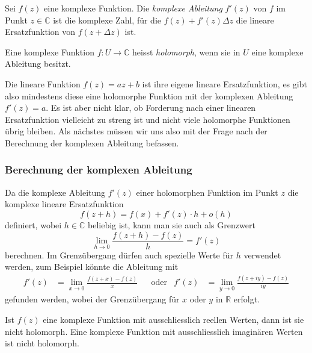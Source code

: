 \begin{definition}
\label{buch:holomorph:diffbar:def:komplexeableitung}
Sei $f(z)$ eine komplexe Funktion.
Die \emph{komplexe Ableitung} $f'(z)$ von $f$ im Punkt
%
$z\in\mathbb{C}$ ist die komplexe Zahl, für die $f(z) + f'(z) \Delta z$
die lineare Ersatzfunktion von $f(z+\Delta z)$ ist.
\end{definition}

\begin{definition}
%
Eine komplexe Funktion $f\colon U\to\mathbb{C}$ heisst \emph{holomorph},
wenn sie in $U$ eine komplexe Ableitung besitzt.
\end{definition}

Die lineare Funktion $f(z) = az+b$ ist ihre eigene lineare Ersatzfunktion,
es gibt also mindestens diese eine holomorphe Funktion mit der komplexen
Ableitung $f'(z)=a$.
Es ist aber nicht klar, ob Forderung nach einer linearen Ersatzfunktion
vielleicht zu streng ist und nicht viele holomorphe Funktionen übrig
bleiben.
Als nächstes müssen wir uns also mit der Frage nach der Berechnung der
komplexen Ableitung befassen.

%
%
\subsubsection{Berechnung der komplexen Ableitung}
Da die komplexe Ableitung $f'(z)$ einer holomorphen Funktion im Punkt $z$
die komplexe lineare Ersatzfunktion 
\[
f(z+h) = f(x) + f'(z)\cdot h + o(h)
\]
definiert, wobei $h\in\mathbb{C}$ beliebig ist, kann man sie auch als
Grenzwert
\[
\lim_{h\to 0}
\frac{f(z+h)-f(z)}{h}
=
f'(z)
\]
berechnen.
Im Grenzübergang dürfen auch spezielle Werte für $h$ verwendet werden,
zum Beispiel könnte die Ableitung mit
\begin{align}
f'(z)
&=
\lim_{x\to 0}
\frac{f(z+x)-f(z)}{x}
&&\text{oder}&
f'(z)
&=
\lim_{y\to 0}
\frac{f(z+iy)-f(z)}{iy}
\label{buch:holomorph:holomorph:eqn:ablxy}
\end{align}
gefunden werden, wobei der Grenzübergang für $x$ oder $y$ in $\mathbb{R}$
erfolgt.

\begin{lemma}
\label{buch:holomorph:holomorph:lemma:reellnichtholomorph}
Ist $f(z)$ eine komplexe Funktion mit ausschliesslich reellen Werten,
dann ist sie nicht holomorph.
Eine komplexe Funktion mit ausschliesslich imaginären Werten ist
nicht holomorph.
\end{lemma}

